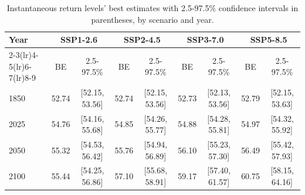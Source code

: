 \begin{table}[htbp]
\centering
\begin{tabular}{lcccccccc}
\toprule
Year & \multicolumn{2}{c}{\textbf{SSP1-2.6}} & \multicolumn{2}{c}{\textbf{SSP2-4.5}} & \multicolumn{2}{c}{\textbf{SSP3-7.0}} & \multicolumn{2}{c}{\textbf{SSP5-8.5}} \\
\cmidrule(lr){2-3}\cmidrule(lr){4-5}\cmidrule(lr){6-7}\cmidrule(lr){8-9}
 & BE & 2.5-97.5\% & BE & 2.5-97.5\% & BE & 2.5-97.5\% & BE & 2.5-97.5\% \\
\midrule
1850 & 52.74 & [52.15, 53.56] & 52.74 & [52.15, 53.56] & 52.73 & [52.13, 53.56] & 52.79 & [52.15, 53.63] \\
2025 & 54.76 & [54.16, 55.68] & 54.85 & [54.26, 55.77] & 54.88 & [54.28, 55.81] & 54.97 & [54.32, 55.92] \\
2050 & 55.32 & [54.53, 56.42] & 55.76 & [54.94, 56.89] & 56.10 & [55.23, 57.30] & 56.49 & [55.42, 57.93] \\
2100 & 55.44 & [54.25, 56.86] & 57.10 & [55.68, 58.91] & 59.17 & [57.40, 61.57] & 60.75 & [58.15, 64.16] \\
\bottomrule
\end{tabular}
\caption{Instantaneous return levels' best estimates with 2.5-97.5\% confidence intervals in parentheses, by scenario and year.}
\label{tab:scenarios}
\end{table}